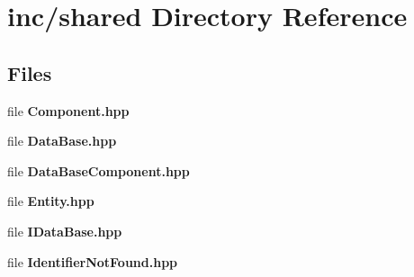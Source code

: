 \section{inc/shared Directory Reference}
\label{dir_ecda0f287c307d056b3c2cb239b6c6d3}
\subsection*{Files}
\begin{DoxyCompactItemize}
\item 
file {\bf Component.\+hpp}
\item 
file {\bf Data\+Base.\+hpp}
\item 
file {\bf Data\+Base\+Component.\+hpp}
\item 
file {\bf Entity.\+hpp}
\item 
file {\bf I\+Data\+Base.\+hpp}
\item 
file {\bf Identifier\+Not\+Found.\+hpp}
\end{DoxyCompactItemize}
